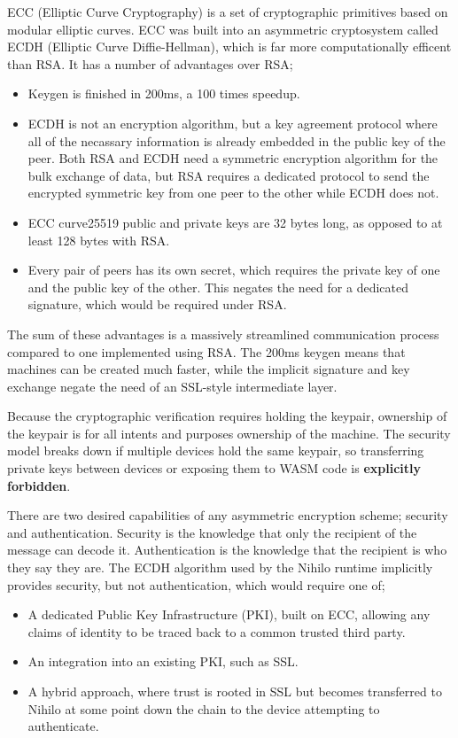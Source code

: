 \documentclass{article}
\begin{document}
ECC \cite{ecc}(Elliptic Curve Cryptography) is a set of cryptographic primitives based on modular elliptic curves. ECC was built into an asymmetric cryptosystem called ECDH (Elliptic Curve Diffie-Hellman), which is far more computationally efficent than RSA. It has a number of advantages over RSA;
\begin{itemize}
\item Keygen is finished in 200ms, a 100 times speedup.
\item ECDH is not an encryption algorithm, but a key agreement protocol where all of the necassary information is already embedded in the public key of the peer. Both RSA and ECDH need a symmetric encryption algorithm for the bulk exchange of data, but RSA requires a dedicated protocol to send the encrypted symmetric key from one peer to the other while ECDH does not.
\item ECC curve25519 public and private keys are 32 bytes long, as opposed to at least 128 bytes with RSA.
\item Every pair of peers has its own secret, which requires the private key of one and the public key of the other. This negates the need for a dedicated signature, which would be required under RSA.
\end{itemize}

The sum of these advantages is a massively streamlined communication process compared to one implemented using RSA. The 200ms keygen means that machines can be created much faster, while the implicit signature and key exchange negate the need of an SSL-style intermediate layer.

Because the cryptographic verification requires holding the keypair, ownership of the keypair is for all intents and purposes ownership of the machine. The security model breaks down if multiple devices hold the same keypair, so transferring private keys between devices or exposing them to WASM code is \textbf{explicitly forbidden}.

There are two desired capabilities of any asymmetric encryption scheme; security and authentication. Security is the knowledge that only the recipient of the message can decode it. Authentication is the knowledge that the recipient is who they say they are. The ECDH algorithm used by the Nihilo runtime implicitly provides security, but not authentication, which would require one of;

\begin{itemize}
\item A dedicated Public Key Infrastructure (PKI), built on ECC, allowing any claims of identity to be traced back to a common trusted third party.
\item An integration into an existing PKI, such as SSL.
\item A hybrid approach, where trust is rooted in SSL but becomes transferred to Nihilo at some point down the chain to the device attempting to authenticate.
\end{itemize}
\end{document}
